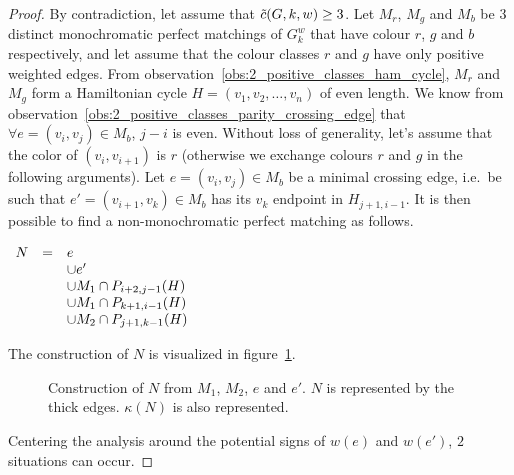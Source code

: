 \begin{proof}
    By contradiction, let assume that $\Tilde{c}(G, k, w) \geq 3$.
    Let $M_r$, $M_g$ and $M_b$ be 3 distinct monochromatic perfect matchings of $G_k^w$ that have colour $r$, $g$ and $b$ respectively, and let assume that the colour classes $r$ and $g$ have only positive weighted edges.
    From observation~\ref{obs:2_positive_classes_ham_cycle}, $M_r$ and $M_g$ form a Hamiltonian cycle $H = (v_1, v_2, \dots, v_n)$ of even length.
    We know from observation~\ref{obs:2_positive_classes_parity_crossing_edge} that $\forall e = (v_i, v_j) \in M_b$, $j-i$ is even.
    Without loss of generality, let's assume that the color of $(v_i, v_{i + 1})$ is $r$ (otherwise we exchange colours $r$ and $g$ in the following arguments).
    Let $e = (v_i, v_j) \in M_b$ be a minimal crossing edge, i.e.\ be such that $e' = (v_{i+1}, v_k) \in M_b$ has its $v_k$ endpoint in $H_{j+1, i-1}$.
    It is then possible to find a non-monochromatic perfect matching as follows.

    \begin{center}
        $\begin{array}{r c l}
             N & = & e                           \\
             &   & \cup e'                       \\
             &   & \cup M_1 \cap P_{i+2, j-1}(H) \\
             &   & \cup M_1 \cap P_{k+1, i-1}(H) \\
             &   & \cup M_2 \cap P_{j+1, k-1}(H)
        \end{array}$
    \end{center}

    The construction of $N$ is visualized in figure~\ref{fig:2_pos_classes_proof}.

    \begin{figure}[H]
        \caption{Construction of $N$ from $M_1$, $M_2$, $e$ and $e'$. $N$ is represented by the thick edges. $\kappa(N)$ is also represented.}
        \label{fig:2_pos_classes_proof}
    \end{figure}

    Centering the analysis around the potential signs of $w(e)$ and $w(e')$, $2$ situations can occur.


\end{proof}
